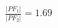 \documentclass[preview]{standalone}
\begin{document}
\begin{align*}
\frac{|PF_1|}{|PF_2|} = 1.69
\end{align*}
\end{document}
